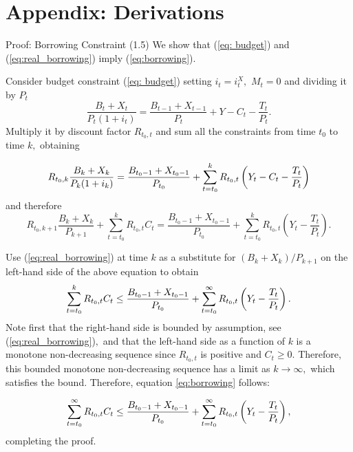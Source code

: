 \documentclass[11pt,aspectratio=169]{beamer}
\begin{document}
\appendix
\section{Appendix: Derivations}
\begin{frame}[label=borrowing_proof]{Proof: Borrowing Constraint (1.5)}
We show that (\ref{eq: budget}) and (\ref{eq:real_borrowing}) imply (\ref{eq:borrowing}).

Consider budget constraint (\ref{eq: budget}) setting $i_{t}=i_{t}^{X},$ $%
M_{t}=0 $ and dividing it by $P_{t}$%
\begin{equation*}
\frac{B_{t}+X_{t}}{P_{t}(1+i_{t})}=\frac{B_{t-1}+X_{t-1}}{P_{t}}+Y-C_{t}-%
\frac{T_{t}}{P_{t}}.
\end{equation*}%
Multiply it by discount factor $R_{t_{0},t}$ and sum all the constraints
from time $t_{0}$ to time $k,$ obtaining%
\end{frame}
\begin{frame}
\begin{equation*}
R_{t_{0},k}\frac{B_{k}+X_{k}}{P_{k}(1+i_{k})}=\frac{B_{t_{0}-1}+X_{t_{0}-1}}{%
P_{t_{0}}}+\sum_{t=t_{0}}^{k}R_{t_{0},t}\left( Y_{t}-C_{t}-\frac{T_{t}}{P_{t}%
}\right)
\end{equation*}%
and therefore%
\begin{equation}
R_{t_{0},k+1}\frac{B_{k}+X_{k}}{P_{k+1}}+\sum_{t=t_{0}}^{k}R_{t_{0},t}C_{t}=%
\frac{B_{t_{0}-1}+X_{t_{0}-1}}{P_{t_{0}}}+\sum_{t=t_{0}}^{k}R_{t_{0},t}%
\left( Y_{t}-\frac{T_{t}}{P_{t}}\right) .  \label{A1}
\end{equation}%
\end{frame}

\begin{frame}
Use (\ref{eq:real_borrowing}) at time $k$ as a substitute for $(B_{k}+X_{k})/P_{k+1}$ on
the left-hand side of the above equation to obtain%
\begin{equation*}
\sum_{t=t_{0}}^{k}R_{t_{0},t}C_{t}\leq \frac{B_{t_{0}-1}+X_{t_{0}-1}}{%
P_{t_{0}}}+\sum_{t=t_{0}}^{\infty }R_{t_{0},t}\left( Y_{t}-\frac{T_{t}}{P_{t}%
}\right) .
\end{equation*}%
Note first that the right-hand side is bounded by assumption, see (\ref{eq:real_borrowing})$%
,$ and that the left-hand side as a function of $k$ is a monotone
non-decreasing sequence since $R_{t_{0},t}$ is positive and $C_{t}\geq 0.$
Therefore, this bounded monotone non-decreasing sequence has a limit as $%
k\rightarrow \infty ,$ which satisfies the bound. Therefore, equation \eqref{eq:borrowing} follows:

\begin{equation}
\sum_{t=t_{0}}^{\infty }R_{t_{0},t}C_{t}\leq \frac{B_{t_{0}-1}+X_{t_{0}-1}}{%
P_{t_{0}}}+\sum_{t=t_{0}}^{\infty }R_{t_{0},t}\left( Y_{t}-\frac{T_{t}}{P_{t}%
}\right) ,  \label{IBCCApp}
\end{equation}%
completing the proof.
\begin{center}
\hyperlink{borrowing}{}
\end{center}
\end{frame}
\end{document}
